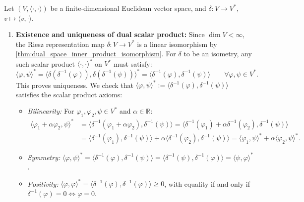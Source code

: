 \begin{exercisesolution}
\label{sol:dual_space_inner_product_isometry}
Let $(V, \langle \cdot, \cdot \rangle)$ be a finite-dimensional Euclidean vector space, and $\delta \colon V \to V^*$, $v \mapsto \langle v, \cdot \rangle$.
\begin{enumerate}[label=\textbf{(\alph*)}]
    \item \textbf{Existence and uniqueness of dual scalar product:}
    Since $\dim V < \infty$, the Riesz representation map $\delta \colon V \to V^*$ is a linear isomorphism by \cref{thm:dual_space_inner_product_isomorphism}.
    For $\delta$ to be an isometry, any such scalar product $\langle \cdot, \cdot \rangle^*$ on $V^*$ must satisfy:
    \[
    \langle \varphi, \psi \rangle^* = \langle \delta(\delta^{-1}(\varphi)), \delta(\delta^{-1}(\psi)) \rangle^* = \langle \delta^{-1}(\varphi), \delta^{-1}(\psi) \rangle \qquad \forall \varphi, \psi \in V^*.
    \]
    This proves uniqueness. We check that $\langle \varphi, \psi \rangle^* := \langle \delta^{-1}(\varphi), \delta^{-1}(\psi) \rangle$ satisfies the scalar product axioms:
    \begin{itemize}
        \item \emph{Bilinearity:} For $\varphi_1, \varphi_2, \psi \in V^*$ and $\alpha \in \mathbb{R}$:
        \begin{align*}
        \langle \varphi_1 + \alpha \varphi_2, \psi \rangle^* &= \langle \delta^{-1}(\varphi_1 + \alpha \varphi_2), \delta^{-1}(\psi) \rangle = \langle \delta^{-1}(\varphi_1) + \alpha \delta^{-1}(\varphi_2), \delta^{-1}(\psi) \rangle \\
        &= \langle \delta^{-1}(\varphi_1), \delta^{-1}(\psi) \rangle + \alpha \langle \delta^{-1}(\varphi_2), \delta^{-1}(\psi) \rangle = \langle \varphi_1, \psi \rangle^* + \alpha \langle \varphi_2, \psi \rangle^*.
        \end{align*}
        \item \emph{Symmetry:} $\langle \varphi, \psi \rangle^* = \langle \delta^{-1}(\varphi), \delta^{-1}(\psi) \rangle = \langle \delta^{-1}(\psi), \delta^{-1}(\varphi) \rangle = \langle \psi, \varphi \rangle^*$.
        \item \emph{Positivity:} $\langle \varphi, \varphi \rangle^* = \langle \delta^{-1}(\varphi), \delta^{-1}(\varphi) \rangle \ge 0$, with equality if and only if $\delta^{-1}(\varphi) = 0 \iff \varphi = 0$.
    \end{itemize}


\end{enumerate}
\end{exercisesolution}
